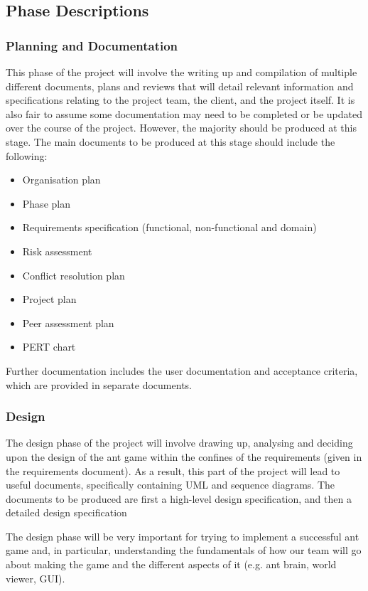 \documentclass[11pt]{article}
\begin{document}
\subsection{Phase Descriptions}

\subsubsection{Planning and Documentation}

This phase of the project will involve the writing up and compilation of multiple different documents, plans and reviews that will detail relevant information and specifications relating to the project team, the client, and the project itself. It is also fair to assume some documentation may need to be completed or be updated over the course of the project. However, the majority should be produced at this stage. The main documents to be produced at this stage should include the following:
\begin{itemize}
\item Organisation plan
\item Phase plan
\item Requirements specification (functional, non-functional and domain)
\item Risk assessment
\item Conflict resolution plan
\item Project plan
\item Peer assessment plan
\item PERT chart
\end{itemize}
Further documentation includes the user documentation and acceptance criteria, which are provided in separate documents.

\subsubsection{Design}

The design phase of the project will involve drawing up, analysing and deciding upon the design of the ant game within the confines of the requirements (given in the requirements document). As a result, this part of the project will lead to useful documents, specifically containing UML and sequence diagrams. The documents to be produced are first a high-level design specification, and then a detailed design specification

The design phase will be very important for trying to implement a successful ant game and, in particular, understanding the fundamentals of how our team will go about making the game and the different aspects of it (e.g. ant brain, world viewer, GUI).
\end{document}
